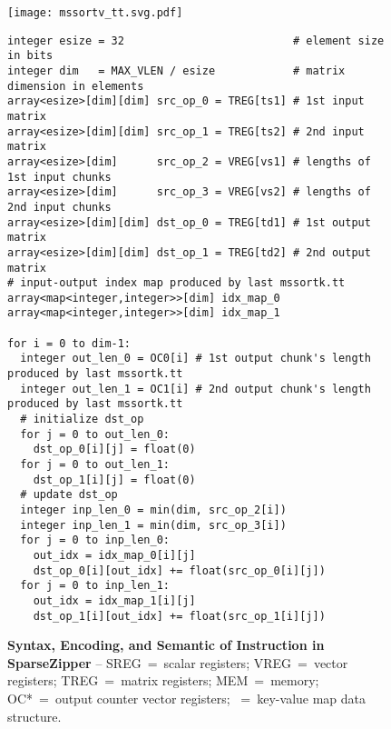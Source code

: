 \lstset{style=python-style}

\begin{figure*}[tp]
\centering


\texttt{[image: mssortv\_tt.svg.pdf]}
\begin{lstlisting}[xleftmargin=0.025\tw]
integer esize = 32                          # element size in bits
integer dim   = MAX_VLEN / esize            # matrix dimension in elements
array<esize>[dim][dim] src_op_0 = TREG[ts1] # 1st input matrix
array<esize>[dim][dim] src_op_1 = TREG[ts2] # 2nd input matrix
array<esize>[dim]      src_op_2 = VREG[vs1] # lengths of 1st input chunks
array<esize>[dim]      src_op_3 = VREG[vs2] # lengths of 2nd input chunks
array<esize>[dim][dim] dst_op_0 = TREG[td1] # 1st output matrix
array<esize>[dim][dim] dst_op_1 = TREG[td2] # 2nd output matrix
# input-output index map produced by last mssortk.tt
array<map<integer,integer>>[dim] idx_map_0
array<map<integer,integer>>[dim] idx_map_1

for i = 0 to dim-1:
  integer out_len_0 = OC0[i] # 1st output chunk's length produced by last mssortk.tt
  integer out_len_1 = OC1[i] # 2nd output chunk's length produced by last mssortk.tt
  # initialize dst_op
  for j = 0 to out_len_0:
    dst_op_0[i][j] = float(0)
  for j = 0 to out_len_1:
    dst_op_1[i][j] = float(0)
  # update dst_op
  integer inp_len_0 = min(dim, src_op_2[i])
  integer inp_len_1 = min(dim, src_op_3[i])
  for j = 0 to inp_len_0:
    out_idx = idx_map_0[i][j]
    dst_op_0[i][out_idx] += float(src_op_0[i][j])
  for j = 0 to inp_len_1:
    out_idx = idx_map_1[i][j]
    dst_op_1[i][out_idx] += float(src_op_1[i][j])
\end{lstlisting}

\caption[Stream Value Sorting Instruction in SparseZipper]{
  \textbf{Syntax, Encoding, and Semantic of  Instruction in SparseZipper} --
  SREG~=~scalar registers;
  VREG~=~vector registers;
  TREG~=~matrix registers;
  MEM~=~memory;
  OC*~=~output counter vector registers;
  ~=~key-value map data structure.
}
\label{fig:spz-mssortv-inst}
\end{figure*}
